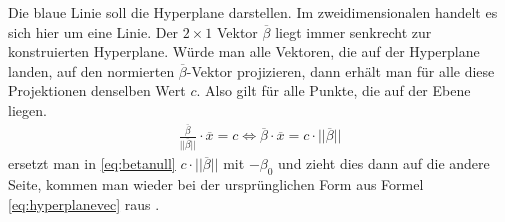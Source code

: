 \documentclass[
]{article}
\begin{document}
Die blaue Linie soll die Hyperplane darstellen. Im zweidimensionalen
handelt es sich hier um eine Linie. Der \(2 \times 1\) Vektor
\(\overline{\beta}\) liegt immer senkrecht zur konstruierten Hyperplane.
Würde man alle Vektoren, die auf der Hyperplane landen, auf den
normierten \(\overline{\beta}\)-Vektor projizieren, dann erhält man für
alle diese Projektionen denselben Wert \(c\). Also gilt für alle Punkte,
die auf der Ebene liegen. \begin{align}
\frac{\overline \beta}{||\overline{\beta}||}\cdot \overline{x}=c \Leftrightarrow \overline{\beta}\cdot \overline{x}=c \cdot ||\overline{\beta}||\label{eq:betanull}
\end{align} ersetzt man in \eqref{eq:betanull}
\(c \cdot ||\overline{\beta}||\) mit \(-\beta_0\) und zieht dies dann
auf die andere Seite, kommen man wieder bei der ursprünglichen Form aus
Formel \eqref{eq:hyperplanevec} raus
\parencite{mavroforakisGeometricApproachSupport2006}.
\end{document}
